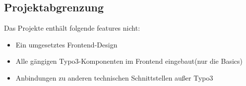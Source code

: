 \subsection{Projektabgrenzung} 
\label{sec:Projektabgrenzung}

Das Projekte enthält folgende features nicht:

\begin{itemize}
	\item Ein umgesetztes Frontend-Design
	\item Alle gängigen Typo3-Komponenten im Frontend eingebaut(nur die Basics)
	\item Anbindungen zu anderen technischen Schnittstellen außer Typo3
\end{itemize}
